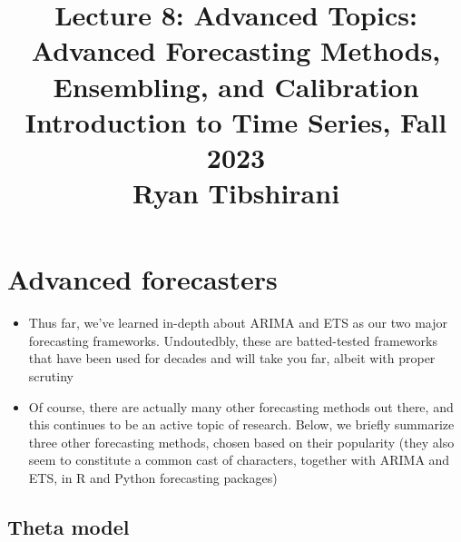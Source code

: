 \documentclass{article}
\title{Lecture 8: Advanced Topics: Advanced Forecasting Methods, Ensembling,
  and Calibration \\ \smallskip 
\large Introduction to Time Series, Fall 2023 \\ \smallskip
Ryan Tibshirani}
\date{}
\begin{document}
\maketitle
\RaggedRight
\vspace{-50pt}

\section{Advanced forecasters}

\begin{itemize}
\item Thus far, we've learned in-depth about ARIMA and ETS as our two major 
  forecasting frameworks. Undoutedbly, these are batted-tested frameworks that 
  have been used for decades and will take you far, albeit with proper scrutiny 

\item Of course, there are actually many other forecasting methods out there,
  and this continues to be an active topic of research. Below, we briefly
  summarize three other forecasting methods, chosen based on their popularity
  (they also seem to constitute a common cast of characters, together with ARIMA
  and ETS, in R and Python forecasting packages)       
\end{itemize}

\subsection{Theta model}
\end{document}
